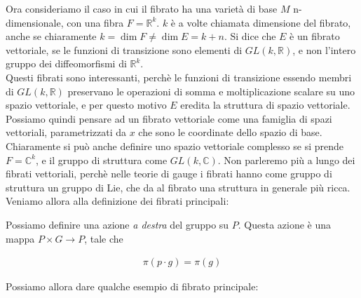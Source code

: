 \documentclass{report}
\begin{document}
Ora consideriamo il caso in cui il fibrato ha una varietà di base \(M\) n-dimensionale, con una fibra \(F = \mathbb{R}^k\). \(k\) è a volte chiamata dimensione del fibrato, anche se chiaramente \(k = \dim F \neq \dim E = k+n\). Si dice che \(E\) è un fibrato vettoriale, se le funzioni di transizione sono elementi di \(GL(k, \mathbb{R})\), e non l'intero gruppo dei diffeomorfismi di \(\mathbb{R}^k\). \\

Questi fibrati sono interessanti, perchè le funzioni di transizione essendo membri di \(GL(k, \mathbb{R})\) preservano le operazioni di somma e moltiplicazione scalare su uno spazio vettoriale, e per questo motivo \(E\) eredita la struttura di spazio vettoriale. Possiamo quindi pensare ad un fibrato vettoriale come una famiglia di spazi vettoriali, parametrizzati da \(x\) che sono le coordinate dello spazio di base. Chiaramente si può anche definire uno spazio vettoriale complesso se si prende \(F = \mathbb{C}^k\), e il gruppo di struttura come \(GL(k , \mathbb{C})\). Non parleremo più a lungo dei fibrati vettoriali, perchè nelle teorie di gauge i fibrati hanno come gruppo di struttura un gruppo di Lie, che da al fibrato una struttura in generale più ricca. \\

Veniamo allora alla definizione dei fibrati principali: 


Possiamo definire una azione \emph{a destra} del gruppo su \(P\). Questa azione è una mappa \(P \times G \rightarrow P\), tale che 

\begin{align}
    \pi(p \cdot g) = \pi(g)
\end{align}

Possiamo allora dare qualche esempio di fibrato principale: 
\end{document}

